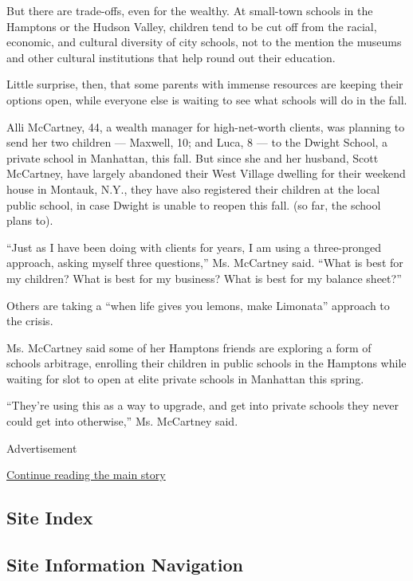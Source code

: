 But there are trade-offs, even for the wealthy. At small-town schools in
the Hamptons or the Hudson Valley, children tend to be cut off from the
racial, economic, and cultural diversity of city schools, not to the
mention the museums and other cultural institutions that help round out
their education.

Little surprise, then, that some parents with immense resources are
keeping their options open, while everyone else is waiting to see what
schools will do in the fall.

Alli McCartney, 44, a wealth manager for high-net-worth clients, was
planning to send her two children --- Maxwell, 10; and Luca, 8 --- to
the Dwight School, a private school in Manhattan, this fall. But since
she and her husband, Scott McCartney, have largely abandoned their West
Village dwelling for their weekend house in Montauk, N.Y., they have
also registered their children at the local public school, in case
Dwight is unable to reopen this fall. (so far, the school plans to).

``Just as I have been doing with clients for years, I am using a
three-pronged approach, asking myself three questions,'' Ms. McCartney
said. ``What is best for my children? What is best for my business? What
is best for my balance sheet?''

Others are taking a ``when life gives you lemons, make Limonata''
approach to the crisis.

Ms. McCartney said some of her Hamptons friends are exploring a form of
schools arbitrage, enrolling their children in public schools in the
Hamptons while waiting for slot to open at elite private schools in
Manhattan this spring.

``They're using this as a way to upgrade, and get into private schools
they never could get into otherwise,'' Ms. McCartney said.

Advertisement

\protect\hyperlink{after-bottom}{Continue reading the main story}

\hypertarget{site-index}{%
\subsection{Site Index}\label{site-index}}

\hypertarget{site-information-navigation}{%
\subsection{Site Information
Navigation}\label{site-information-navigation}}


